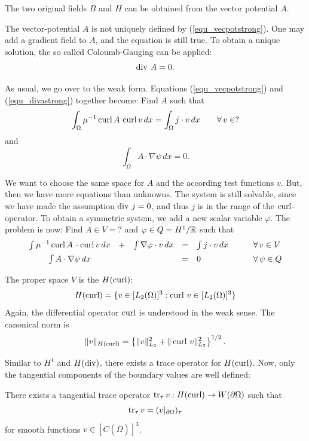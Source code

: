 The two original fields $B$ and $H$ can be obtained from the vector potential $A$.

The vector-potential $A$ is not uniquely defined by (\ref{equ_vecpotstrong}). One
may add a gradient field to $A$, and the equation is still true. To obtain a unique
solution, the so called Coloumb-Gauging can be applied:
\begin{equation}
\label{equ_divastrong}
\operatorname{div} \, A = 0.
\end{equation}

As usual, we go over to the weak form. Equations (\ref{equ_vecpotstrong}) and
(\ref{equ_divastrong}) together become: Find $A$ such that
$$
\int_\Omega \mu^{-1} \operatorname{curl} A \, \operatorname{curl} v \, dx = \int_\Omega j \cdot v \, dx \qquad \forall \, v \in ?
$$
and
$$
\int_\Omega A \cdot \nabla \psi \, dx = 0.
$$

We want to choose the same space for $A$ and the according test functions $v$. But,
then we have more equations than unknowns. The system is still solvable, since we
have made the assumption $\operatorname{div} \, j = 0$, and thus $j$ is in the range of the $\operatorname{curl}$-
operator. To obtain a symmetric system, we add a new scalar variable $\varphi$.
The problem is now: Find $A \in V = ?$ and $\varphi \in Q = H^1 / {\mathbb R}$ such that
\begin{equation} \label{equ_vecpotmixed}
\begin{array}{ccccll}
\int \mu^{-1} \operatorname{curl} A \, \cdot \operatorname{curl} v \, dx & + & 
\int \nabla \varphi \cdot v \, dx & = & 
\int j \cdot v \, dx \qquad & \forall \, v \in V \\[0.5em]
\int A \cdot \nabla \psi \, dx & & & = & 0 & \forall \, \psi \in Q
\end{array}
\end{equation}

The proper space $V$ is the $H(\operatorname{curl})$: 
$$
H(\operatorname{curl}) = \{ v \in [L_2(\Omega)]^3 : \operatorname{curl} \, v  \in [L_2(\Omega)]^3 \}
$$
Again, the differential operator $\operatorname{curl}$ is understood in the weak sense.
The canonical norm is
$$
\| v \|_{H(\operatorname{curl})} = \left\{ \| v \|_{L_2}^2 + \| \operatorname{curl} \, v \|_{L_2}^2 \right\}^{1/2}.
$$

Similar to $H^1$ and $H(\operatorname{div})$, there exists a trace operator for $H(\operatorname{curl})$. Now,
only the tangential components of the boundary values are well defined:

\begin{theorem}  There exists a tangential trace operator $\operatorname{tr}_\tau v : H(\operatorname{curl}) \rightarrow W(\partial \Omega)$ such that
$$
\operatorname{tr}_\tau v = (v|_{\partial \Omega})_\tau
$$
for smooth functions $v \in [C(\overline \Omega)]^3$. 
\end{theorem}

